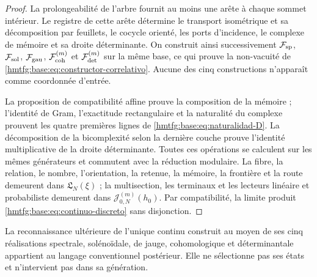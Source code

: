 \begin{proof}
La prolongeabilité de l'arbre fournit au moins une arête à chaque sommet intérieur. Le registre de cette arête détermine le transport isométrique et sa décomposition par feuillets, le cocycle orienté, les ports d'incidence, le complexe de mémoire et sa droite déterminante. On construit ainsi successivement \(\mathcal F_{\rm sp}\), \(\mathcal F_{\rm sol}\), \(\mathcal F_{\rm gau}\), \(\mathcal F_{\rm coh}^{(m)}\) et \(\mathcal F_{\rm det}^{(m)}\) sur la même base, ce qui prouve la non-vacuité de \eqref{hmtfg:base:eq:constructor-correlativo}. Aucune des cinq constructions n'apparaît comme coordonnée d'entrée.

La proposition de compatibilité affine prouve la composition de la mémoire ;
l'identité de Gram, l'exactitude rectangulaire et la naturalité du complexe
prouvent les quatre premières lignes de \eqref{hmtfg:base:eq:naturalidad-D}. La
décomposition de la bicomplexité selon la dernière couche prouve l'identité
multiplicative de la droite déterminante. Toutes ces opérations se calculent
sur les mêmes générateurs et commutent avec la réduction modulaire. La fibre,
la relation, le nombre, l'orientation, la retenue, la mémoire, la frontière et
la route demeurent dans \(\mathfrak L_N(\xi)\) ; la multisection, les terminaux
et les lecteurs linéaire et probabiliste demeurent dans
\(\mathcal J_{0,N}^{(m)}(h_0)\). Par compatibilité, la limite produit
\eqref{hmtfg:base:eq:continuo-discreto} sans disjonction.
\end{proof}

La reconnaissance ultérieure de l'unique continu construit au moyen de ses cinq
réalisations spectrale, solénoïdale, de jauge, cohomologique et déterminantale
appartient au langage conventionnel postérieur. Elle ne sélectionne pas ses états et
n'intervient pas dans sa génération.
\fi


